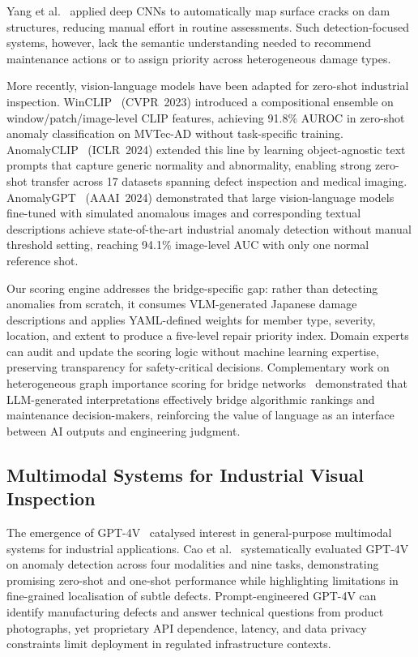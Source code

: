 \documentclass[twocolumn]{article}
\begin{document}
Yang et al.~\cite{yang2018dam} applied deep CNNs to automatically map surface
cracks on dam structures, reducing manual effort in routine assessments.
Such detection-focused systems, however, lack the semantic understanding
needed to recommend maintenance actions or to assign priority across
heterogeneous damage types.

More recently, vision-language models have been adapted for zero-shot
industrial inspection.
WinCLIP~\cite{jeong2023winclip} (CVPR~2023) introduced a compositional
ensemble on window/patch/image-level CLIP features, achieving 91.8\% AUROC
in zero-shot anomaly classification on MVTec-AD without task-specific training.
AnomalyCLIP~\cite{zhou2024anomalyclip} (ICLR~2024) extended this line by
learning object-agnostic text prompts that capture generic normality and
abnormality, enabling strong zero-shot transfer across 17 datasets spanning
defect inspection and medical imaging.
AnomalyGPT~\cite{gu2024anomalygpt} (AAAI~2024) demonstrated that large
vision-language models fine-tuned with simulated anomalous images and
corresponding textual descriptions achieve state-of-the-art industrial
anomaly detection without manual threshold setting, reaching 94.1\% image-level
AUC with only one normal reference shot.

Our scoring engine addresses the bridge-specific gap: rather than detecting
anomalies from scratch, it consumes VLM-generated Japanese damage descriptions
and applies YAML-defined weights for member type, severity, location, and
extent to produce a five-level repair priority index.
Domain experts can audit and update the scoring logic without machine learning
expertise, preserving transparency for safety-critical decisions.
Complementary work on heterogeneous graph importance scoring for bridge
networks~\cite{yasuno2026graph} demonstrated that LLM-generated
interpretations effectively bridge algorithmic rankings and maintenance
decision-makers, reinforcing the value of language as an interface between
AI outputs and engineering judgment.

\subsection{Multimodal Systems for Industrial Visual Inspection}

The emergence of GPT-4V~\cite{openai2023gpt4} catalysed interest in
general-purpose multimodal systems for industrial applications.
Cao et al.~\cite{cao2023gpt4vanomaly} systematically evaluated GPT-4V on
anomaly detection across four modalities and nine tasks, demonstrating
promising zero-shot and one-shot performance while highlighting limitations
in fine-grained localisation of subtle defects.
Prompt-engineered GPT-4V can identify manufacturing defects and answer
technical questions from product photographs, yet proprietary API dependence,
latency, and data privacy constraints limit deployment in regulated
infrastructure contexts.
\end{document}
